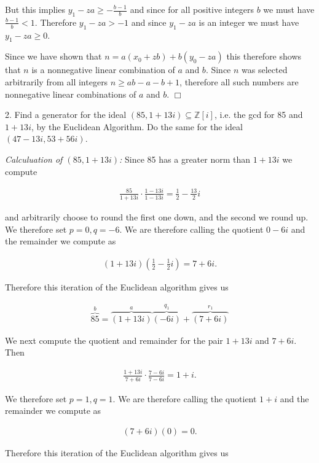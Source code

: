 \documentclass[11pt]{article}
\begin{document}
But this implies $y_1-za \ge -\frac{b-1}{b}$ and since for all positive integers $b$ we must have $\frac{b-1}{b}<1$.  Therefore $y_1-za>-1$ and since $y_1-za$ is an integer we must have $y_1-za\geq 0$.  

Since we have shown that $n=a(x_0+zb)+b(y_0-za)$ this therefore shows that $n$ is a nonnegative linear combination of $a$ and $b$.  Since $n$ was selected arbitrarily from all integers $n\geq ab-a-b+1$, therefore all such numbers are nonnegative linear combinations of $a$ and $b$.  $\Box$

2.  Find a generator for the ideal $(85,1 + 13i) \subseteq \mathbb Z[i]$, i.e.  the gcd for 85 and $1 + 13i$, by the Euclidean Algorithm.  Do the same for the ideal $(47-13i,53 + 56i)$.

{\it Calculuation of $(85,1+13i)$:}  Since 85 has a greater norm than $1+13i$ we compute 

\begin{align*}
    \frac{85}{1+13i}\cdot \frac{1-13i}{1-13i} = \frac 1 2 - \frac{13}{2}i
\end{align*}

and arbitrarily choose to round the first one down, and the second we round up.  We therefore set $p=0,q=-6$.  We are therefore calling the quotient $0-6i$ and the remainder we compute as 

\begin{align*}
    (1+13i)\left(\frac 1 2 - \frac 1 2 i\right) = 7+6i.
\end{align*}

Therefore this iteration of the Euclidean algorithm gives us 

\begin{align*}
    \overbrace{85}^{b}=\overbrace{(1+13i)}^{a}\overbrace{(-6i)}^{q_1} + \overbrace{(7+6i)}^{r_1}
\end{align*}

We next compute the quotient and remainder for the pair $1+13i$ and $7+6i$.  Then 

\begin{align*}
    \frac{1+13i}{7+6i}\cdot \frac{7-6i}{7-6i} = 1+i.
\end{align*}

We therefore set $p=1,q=1$.  We are therefore calling the quotient $1+i$ and the remainder we compute as 

\begin{align*}
    (7+6i)(0) = 0.
\end{align*}

Therefore this iteration of the Euclidean algorithm gives us 
\end{document}
